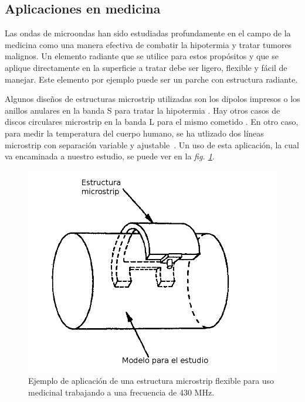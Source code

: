 \subsection{Aplicaciones en medicina}\label{subsec:aplicaciones-en-medicina}

Las ondas de microondas han sido estudiadas profundamente en el campo de la medicina como una manera efectiva de combatir la hipotermia y tratar tumores malignos. Un elemento radiante que se utilice para estos propósitos y que se aplique directamente en la superficie a tratar debe ser ligero, flexible y fácil de manejar. Este elemento por ejemplo puede ser un parche con estructura radiante.

Algunos diseños de estructuras microstrip utilizadas son los dipolos impresos o los anillos anulares en la banda S para tratar la hipotermia \cite{sterzer}. Hay otros casos de discos circulares microstrip en la banda L para el mismo cometido \cite{deleo}. En otro caso, para medir la temperatura del cuerpo humano, se ha utlizado dos líneas microstrip con separación variable y ajustable~\cite{kobay1}. Un uso de esta aplicación, la cual va encaminada a nuestro estudio, se puede ver en la \textit{fig. \ref{fig:fig2.10}}.

\begin{figure}[!htb]
    \centering
    \includegraphics[scale=0.2]{./ContextoTecnologico/antena_medicina}
    \caption{Ejemplo de aplicación de una estructura microstrip flexible para uso medicinal trabajando a una frecuencia de 430 MHz. \cite{kobay2}}
    \label{fig:fig2.10}
\end{figure}


